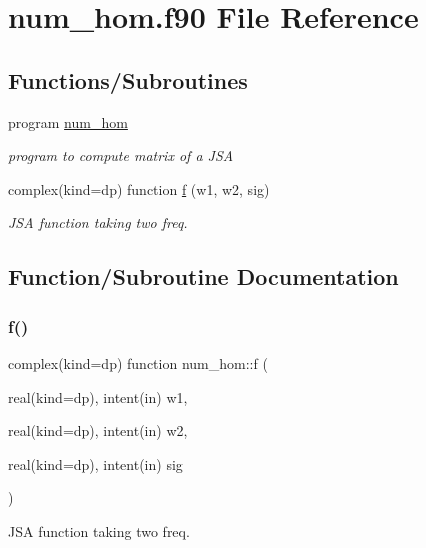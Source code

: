 \hypertarget{num__hom_8f90}{}\section{num\+\_\+hom.\+f90 File Reference}
\label{num__hom_8f90}
\subsection*{Functions/\+Subroutines}
\begin{DoxyCompactItemize}
\item 
program \hyperlink{num__hom_8f90_a7dae3af56c12300a9c9fb1deb246e6e7}{num\+\_\+hom}
\begin{DoxyCompactList}\small\item\em program to compute matrix of a J\+SA \end{DoxyCompactList}\item 
complex(kind=dp) function \hyperlink{num__hom_8f90_a2ea4612463aead6dff28d647f3800909}{f} (w1, w2, sig)
\begin{DoxyCompactList}\small\item\em J\+SA function taking two freq. \end{DoxyCompactList}\end{DoxyCompactItemize}


\subsection{Function/\+Subroutine Documentation}
\mbox{\label{num__hom_8f90_a2ea4612463aead6dff28d647f3800909}} 
\subsubsection{\texorpdfstring{f()}{f()}}
{\footnotesize\ttfamily complex(kind=dp) function num\+\_\+hom\+::f (\begin{DoxyParamCaption}\item[{real(kind=dp), intent(in)}]{w1,  }\item[{real(kind=dp), intent(in)}]{w2,  }\item[{real(kind=dp), intent(in)}]{sig }\end{DoxyParamCaption})}



J\+SA function taking two freq. 

